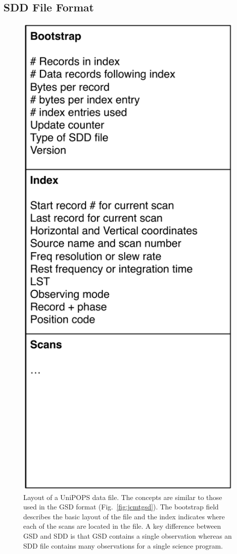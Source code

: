 \documentclass[final,authoryear,5p,times,twocolumn]{elsarticle}
\begin{document}
\subsection{SDD File Format}

\begin{figure}[t]
\begin{center}
\includegraphics[width=0.5\columnwidth]{sdd-file-layout}
\end{center}
\caption{Layout of a UniPOPS data file. The concepts are similar to
  those used in the GSD format (Fig.~\ref{fig:jcmtgsd}). The bootstrap
  field describes the basic layout of the file and the index indicates
  where each of the scans are located in the file. A key difference
  between GSD and SDD is that GSD contains a single observation
  whereas an SDD file contains many observations for a single science
  program.}
\label{fig:nraosdd}
\end{figure}
\end{document}
